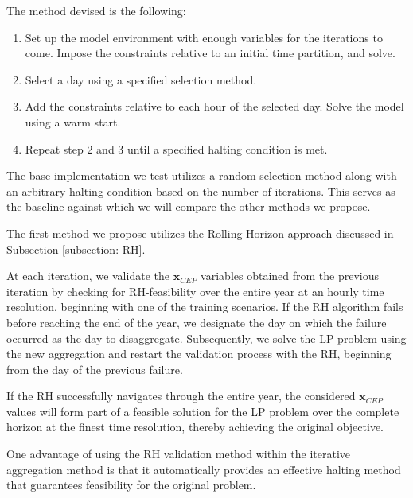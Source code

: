 \documentclass[smallextended,natbib]{svjour3}       %
\numberwithin{definition}{section}
\numberwithin{theorem}{section}
\numberwithin{proposition}{section}
\begin{document}
The method devised is the following:
\label{time-iter-alg}
\begin{enumerate}
\item Set up the model environment with enough variables for the iterations to come. Impose the constraints relative to an initial time partition, and solve.
\item Select a day using a specified selection method.
\item Add the constraints relative to each hour of the selected day. Solve the model using a warm start.
\item Repeat step 2 and 3 until a specified halting condition is met.
\end{enumerate}

The base implementation we test utilizes a random selection method along with an arbitrary halting condition based on the number of iterations. 
This serves as the baseline against which we will compare the other methods we propose.



The first method we propose utilizes the Rolling Horizon approach discussed in Subsection \ref{subsection: RH}. 

At each iteration, we validate the $\mathbf{x}_{CEP}$ variables obtained from the previous iteration by checking for RH-feasibility over the entire year at an hourly time resolution, beginning with one of the training scenarios. 
If the RH algorithm fails before reaching the end of the year, we designate the day on which the failure occurred as the day to disaggregate. 
Subsequently, we solve the LP problem using the new aggregation and restart the validation process with the RH, beginning from the day of the previous failure. 

If the RH successfully navigates through the entire year, the considered $\mathbf{x}_{CEP}$ values will form part of a feasible solution for the LP problem over the complete horizon at the finest time resolution, thereby achieving the original objective. 

One advantage of using the RH validation method within the iterative aggregation method is that it automatically provides an effective halting method that guarantees feasibility for the original problem.
\end{document}
